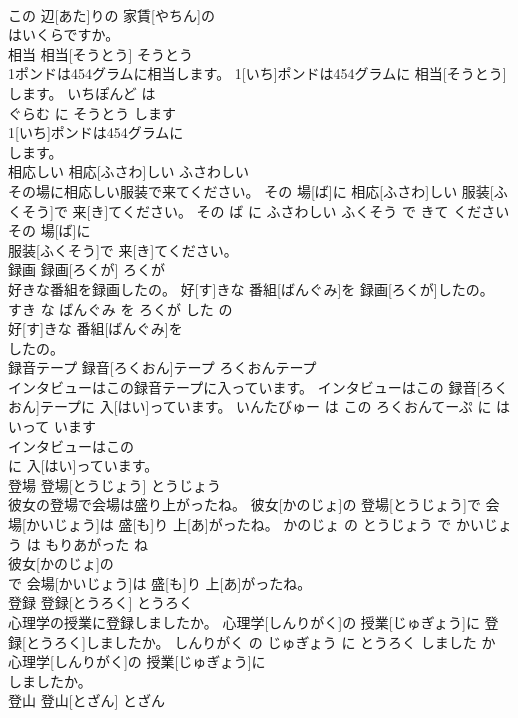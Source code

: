 \documentclass[8pt]{extreport}
\begin{document}
\begin{CJK}{UTF8}{min}
\\	この 辺[あた]りの 家賃[やちん]の
\\	はいくらですか。			
\\	相当	相当[そうとう]	そうとう	
\\	1ポンドは454グラムに相当します。	1[いち]ポンドは454グラムに 相当[そうとう]します。	いちぽんど は 
\\	ぐらむ に そうとう します	
\\	1[いち]ポンドは454グラムに
\\	します。			
\\	相応しい	相応[ふさわ]しい	ふさわしい	
\\	その場に相応しい服装で来てください。	その 場[ば]に 相応[ふさわ]しい 服装[ふくそう]で 来[き]てください。	その ば に ふさわしい ふくそう で きて ください	
\\	その 場[ば]に
\\	服装[ふくそう]で 来[き]てください。			
\\	録画	録画[ろくが]	ろくが	
\\	好きな番組を録画したの。	好[す]きな 番組[ばんぐみ]を 録画[ろくが]したの。	すき な ばんぐみ を ろくが した の	
\\	好[す]きな 番組[ばんぐみ]を
\\	したの。			
\\	録音テープ	録音[ろくおん]テープ	ろくおんテープ	
\\	インタビューはこの録音テープに入っています。	インタビューはこの 録音[ろくおん]テープに 入[はい]っています。	いんたびゅー は この ろくおんてーぷ に はいって います	
\\	インタビューはこの
\\	に 入[はい]っています。			
\\	登場	登場[とうじょう]	とうじょう	
\\	彼女の登場で会場は盛り上がったね。	彼女[かのじょ]の 登場[とうじょう]で 会場[かいじょう]は 盛[も]り 上[あ]がったね。	かのじょ の とうじょう で かいじょう は もりあがった ね	
\\	彼女[かのじょ]の
\\	で 会場[かいじょう]は 盛[も]り 上[あ]がったね。			
\\	登録	登録[とうろく]	とうろく	
\\	心理学の授業に登録しましたか。	心理学[しんりがく]の 授業[じゅぎょう]に 登録[とうろく]しましたか。	しんりがく の じゅぎょう に とうろく しました か	
\\	心理学[しんりがく]の 授業[じゅぎょう]に
\\	しましたか。			
\\	登山	登山[とざん]	とざん	

\end{CJK}
\end{document}
